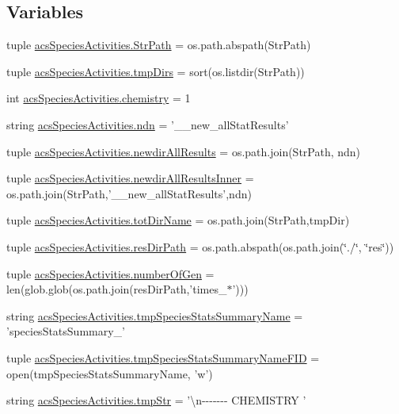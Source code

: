 \subsection*{Variables}
\begin{DoxyCompactItemize}
\item 
tuple \hyperlink{a00103_a05f0f829ce4df27678aa19d4e5f10c54}{acs\-Species\-Activities.\-Str\-Path} = os.\-path.\-abspath(Str\-Path)
\item 
tuple \hyperlink{a00103_addf4c61c6afe70a2ea39931695ddc36b}{acs\-Species\-Activities.\-tmp\-Dirs} = sort(os.\-listdir(Str\-Path))
\item 
int \hyperlink{a00103_a5459c566e6ccdf02747a3c16089a5593}{acs\-Species\-Activities.\-chemistry} = 1
\item 
string \hyperlink{a00103_ad2a87ed28d0f42525ce49c390f390298}{acs\-Species\-Activities.\-ndn} = '\-\_\-\_\-new\-\_\-all\-Stat\-Results'
\item 
tuple \hyperlink{a00103_a4fc28291b7f61ee2fa8969fa7a690ba2}{acs\-Species\-Activities.\-newdir\-All\-Results} = os.\-path.\-join(Str\-Path, ndn)
\item 
tuple \hyperlink{a00103_ae77a5ce35739a29f29f9df698d91f1c9}{acs\-Species\-Activities.\-newdir\-All\-Results\-Inner} = os.\-path.\-join(Str\-Path,'\-\_\-\_\-new\-\_\-all\-Stat\-Results',ndn)
\item 
tuple \hyperlink{a00103_aa71c948cf1d0699207eafcd30beb394e}{acs\-Species\-Activities.\-tot\-Dir\-Name} = os.\-path.\-join(Str\-Path,tmp\-Dir)
\item 
tuple \hyperlink{a00103_a2c1728d3ec9815ec7cf41653e953524c}{acs\-Species\-Activities.\-res\-Dir\-Path} = os.\-path.\-abspath(os.\-path.\-join(\char`\"{}./\char`\"{}, \char`\"{}res\char`\"{}))
\item 
tuple \hyperlink{a00103_acceae37ca98ccf6dc25c9f538fda386f}{acs\-Species\-Activities.\-number\-Of\-Gen} = len(glob.\-glob(os.\-path.\-join(res\-Dir\-Path,'times\-\_\-$\ast$')))
\item 
string \hyperlink{a00103_aceab16acbf85893dcacfcfd921c9da12}{acs\-Species\-Activities.\-tmp\-Species\-Stats\-Summary\-Name} = 'species\-Stats\-Summary\-\_\-'
\item 
tuple \hyperlink{a00103_a57b362cf15dda461a59c719a92177c3a}{acs\-Species\-Activities.\-tmp\-Species\-Stats\-Summary\-Name\-F\-I\-D} = open(tmp\-Species\-Stats\-Summary\-Name, 'w')
\item 
string \hyperlink{a00103_a81ab8133517c53adfcdf8129e24cf5d0}{acs\-Species\-Activities.\-tmp\-Str} = '\textbackslash{}n-\/-\/-\/-\/-\/-\/-\/ C\-H\-E\-M\-I\-S\-T\-R\-Y '

\end{DoxyCompactItemize}

